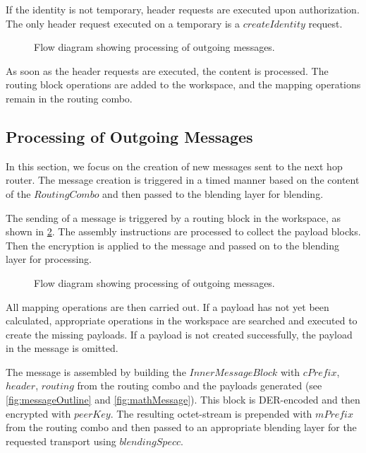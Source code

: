 If the identity is not temporary, header requests are executed upon authorization. The only header request executed on a temporary  is a $createIdentity$ request. 

\begin{figure}[ht]\centering
	\resizebox{0.95\textwidth}{!}{}
	\caption{Flow diagram showing processing of outgoing messages.}
	\label{fig:msgReceiveProcessing}
\end{figure}

As soon as the header requests are executed, the content is processed. The routing block operations are added to the workspace, and the mapping operations remain in the routing combo. 

\subsection{Processing of Outgoing Messages}\label{sec:processingOutgoingMessages}
In this section, we focus on the creation of new messages sent to the next hop router. The message creation is triggered in a timed manner based on the content of the $RoutingCombo$ and then passed to the blending layer for blending.

The sending of a message is triggered by a routing block in the workspace, as shown in \cref{fig:msgSendProcessing}. The assembly instructions are processed to collect the payload blocks. Then the encryption is applied to the message and passed on to the blending layer for processing.

\begin{figure}[ht]\centering
	\resizebox{0.95\textwidth}{!}{}
	\caption{Flow diagram showing processing of outgoing messages.}
	\label{fig:msgSendProcessing}
\end{figure}

All mapping operations are then carried out. If a payload has not yet been calculated, appropriate operations in the workspace are searched and executed to create the missing payloads. If a payload is not created successfully, the payload in the message is omitted. 

The message is assembled by building the $InnerMessageBlock$ with $cPrefix$, $header$, $routing$ from the routing combo and the payloads generated (see \cref{fig:messageOutline} and \cref{fig:mathMessage}). This block is DER-encoded and then encrypted with $peerKey$. The resulting octet-stream is prepended with $mPrefix$ from the routing combo and then passed to an appropriate blending layer for the requested transport using $blendingSpecc$.

